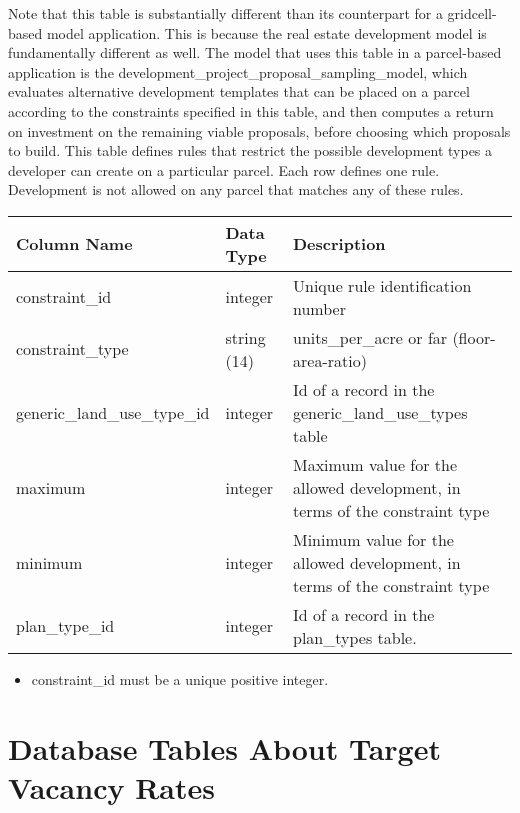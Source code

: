 Note that this table is substantially different than its counterpart for a gridcell-based
model application.  This is because the real estate development model is fundamentally
different as well.  The model that uses this table in a parcel-based application is the 
development\_project\_proposal\_sampling\_model, which evaluates alternative 
development templates that can be placed on a parcel according to the constraints
specified in this table, and then computes a return on investment on the remaining
viable proposals, before choosing which proposals to build.
This table defines rules that restrict the possible development types a
developer can create on a particular parcel.  Each row defines one rule.
Development is not allowed on any parcel that matches any of these rules. 

\begin{tabular}{llp{3.5in}}

\textbf{Column Name} & \textbf{Data Type} & \textbf{Description} \\

\hline constraint_id & integer & Unique rule identification number  \\

\hline constraint\_type & string (14) &  units\_per\_acre or far (floor-area-ratio) \\

\hline generic\_land\_use\_type\_id & integer & Id of a record in the generic\_land\_use\_types table \\

\hline maximum & integer & Maximum value for the allowed development, in terms of the constraint type \\

\hline minimum & integer & Minimum value for the allowed development, in terms of the constraint type \\

\hline plan_type_id & integer & Id of a record in the plan_types table. \\

\hline
\end{tabular}

\begin{itemize}
\tight
\item constraint_id must be a unique positive integer.

\end{itemize}

\section{Database Tables About Target Vacancy Rates}

